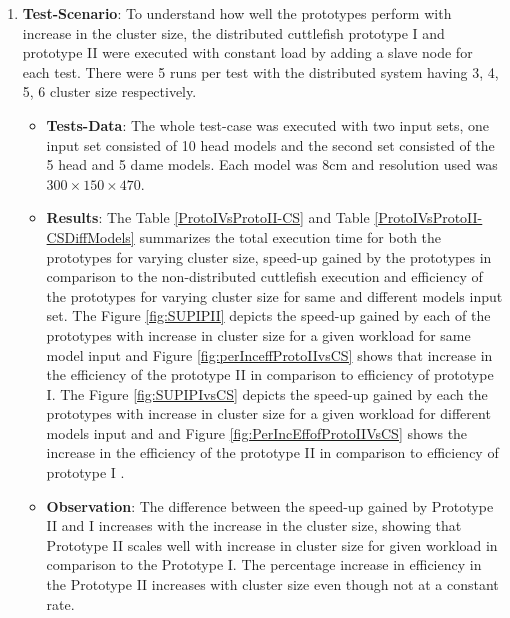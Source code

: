 \begin{enumerate}
\item \textbf{Test-Scenario}: To understand how well the prototypes perform with increase in the cluster size, the distributed cuttlefish prototype I and prototype II were executed with constant load by adding a slave node for each test. There were 5 runs per test with the distributed system having 3, 4, 5, 6 cluster size respectively.
\begin{itemize}
\item \textbf{Tests-Data}: The whole test-case was executed with two input sets, one input set consisted of 10 head models and the second set consisted of the 5 head and 5 dame models. Each model was 8cm and resolution used was \begin{math}300 \times 150 \times 470 \end{math}.  
\item \textbf{Results}: The Table \ref{ProtoIVsProtoII-CS} and Table \ref{ProtoIVsProtoII-CSDiffModels}  summarizes the total execution time for both the prototypes for varying cluster size, speed-up gained by the prototypes in comparison to the non-distributed cuttlefish execution and efficiency of the prototypes for varying cluster size for same and different models input set. The Figure \ref{fig:SUPIPII} depicts the speed-up gained by each of the prototypes with increase in cluster size for a given workload for same model input and Figure \ref{fig:perInceffProtoIIvsCS}  shows that increase in the efficiency of the prototype II in comparison to efficiency of prototype I. The Figure \ref{fig:SUPIPIvsCS} depicts the speed-up gained by each the prototypes with increase in cluster size for a given workload for different models input and and Figure \ref{fig:PerIncEffofProtoIIVsCS} shows the increase in the efficiency of the prototype II in comparison to efficiency of prototype I .
\item \textbf{Observation}: The difference between the speed-up gained by Prototype II and I increases with the increase in the cluster size, showing that Prototype II scales well with increase in cluster size for given workload in comparison to the Prototype I. The percentage increase in efficiency in the Prototype II increases with cluster size even though not at a constant rate. 
\end{itemize}


\end{enumerate}
